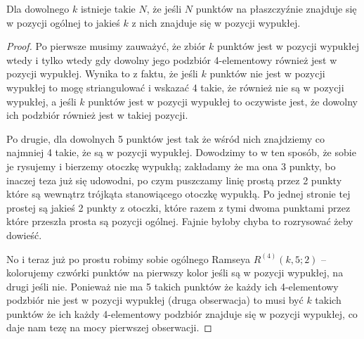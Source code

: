 \begin{theorem}
	Dla dowolnego $k$ istnieje takie $N$, że jeśli $N$ punktów na płaszczyźnie znajduje się w pozycji ogólnej to jakieś $k$ z nich znajduje się w pozycji wypukłej.
\end{theorem}
\begin{proof}
	Po pierwsze musimy zauważyć, że zbiór $k$ punktów jest w pozycji wypukłej wtedy i tylko wtedy gdy dowolny jego podzbiór 4-elementowy również jest w pozycji wypukłej. Wynika to z faktu, że jeśli $k$ punktów nie jest w pozycji wypukłej to mogę striangulować i wskazać 4 takie, że również nie są w pozycji wypukłej, a jeśli $k$ punktów jest w pozycji wypukłej to oczywiste jest, że dowolny ich podzbiór również jest w takiej pozycji.

	Po drugie, dla dowolnych 5 punktów jest tak że wśród nich znajdziemy co najmniej 4 takie, że są w pozycji wypukłej. Dowodzimy to w ten sposób, że sobie je rysujemy i bierzemy otoczkę wypukłą; zakładamy że ma ona 3 punkty, bo inaczej teza już się udowodni, po czym puszczamy linię prostą przez 2 punkty które są wewnątrz trójkąta stanowiącego otoczkę wypukłą. Po jednej stronie tej prostej są jakieś 2 punkty z otoczki, które razem z tymi dwoma punktami przez które przeszła prosta są pozycji ogólnej. Fajnie byłoby chyba to rozrysować żeby dowieść.

	No i teraz już po prostu robimy sobie ogólnego Ramseya $R^{(4)}(k,5;2)$ -- kolorujemy czwórki punktów na pierwszy kolor jeśli są w pozycji wypukłej, na drugi jeśli nie. Ponieważ nie ma 5 takich punktów że każdy ich 4-elementowy podzbiór nie jest w pozycji wypukłej (druga obserwacja) to musi być $k$ takich punktów że ich każdy 4-elementowy podzbiór znajduje się w pozycji wypukłej, co daje nam tezę na mocy pierwszej obserwacji.
\end{proof}